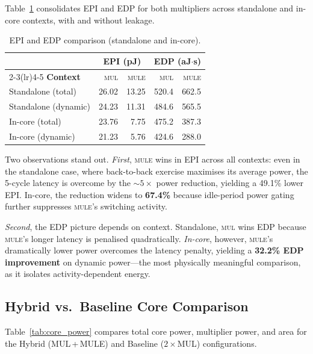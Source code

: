 Table~\ref{tab:epi_edp} consolidates EPI and EDP for both multipliers
across standalone and in-core contexts, with and without leakage.

\begin{table}[t]
  \caption{EPI and EDP comparison (standalone and in-core).}
  \label{tab:epi_edp}
  \centering
  \small
  \begin{tabular}{lrrrr}
    \toprule
    & \multicolumn{2}{c}{\textbf{EPI (pJ)}} & \multicolumn{2}{c}{\textbf{EDP (aJ$\cdot$s)}} \\
    \cmidrule(lr){2-3}\cmidrule(lr){4-5}
    \textbf{Context} & \textsc{mul} & \textsc{mule} & \textsc{mul} & \textsc{mule} \\
    \midrule
    Standalone (total)   & 26.02 & 13.25 & 520.4 & 662.5 \\
    Standalone (dynamic) & 24.23 & 11.31 & 484.6 & 565.5 \\
    In-core (total)      & 23.76 &  7.75 & 475.2 & 387.3 \\
    In-core (dynamic)    & 21.23 &  5.76 & 424.6 & 288.0 \\
    \bottomrule
  \end{tabular}
\end{table}

Two observations stand out.
\emph{First}, \textsc{mule} wins in EPI across all contexts: even in
the standalone case, where back-to-back exercise maximises its average
power, the 5-cycle latency is overcome by the $\sim\!5\times$ power
reduction, yielding a 49.1\% lower EPI.  In-core, the reduction widens
to \textbf{67.4\%} because idle-period power gating further suppresses
\textsc{mule}'s switching activity.

\emph{Second}, the EDP picture depends on context.  Standalone,
\textsc{mul} wins EDP because \textsc{mule}'s longer latency is
penalised quadratically.  \emph{In-core}, however, \textsc{mule}'s
dramatically lower power overcomes the latency penalty, yielding a
\textbf{32.2\% EDP improvement} on dynamic power---the most physically
meaningful comparison, as it isolates activity-dependent energy.

\subsection{Hybrid vs.\ Baseline Core Comparison}\label{sec:eval:hybrid}

Table~\ref{tab:core_power} compares total core power, multiplier
power, and area for the Hybrid (MUL\,+\,MULE) and Baseline
($2\!\times\!$MUL) configurations.


